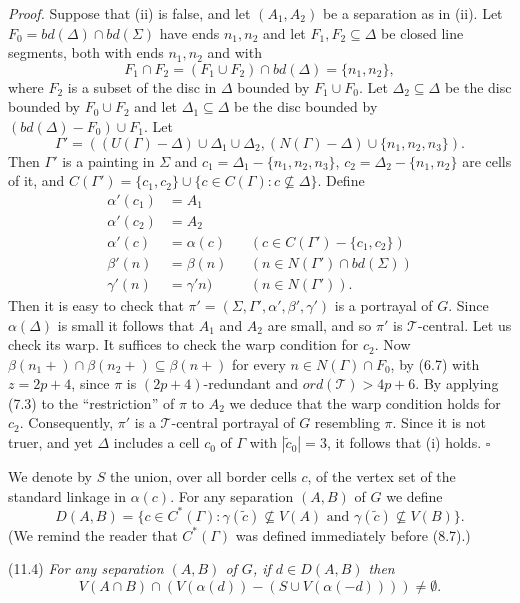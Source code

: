 \textit{Proof.} Suppose that (ii) is false, and let $(A_1, A_2)$ be a separation as in (ii). Let $F_0 = bd(\Delta) \cap bd(\Sigma)$ have ends $n_1, n_2$ and let $F_1, F_2 \subseteq \Delta$ be closed line segments, both with ends $n_1, n_2$ and with
\begin{equation*}
F_1 \cap F_2 = (F_1 \cup F_2) \cap bd(\Delta) = \{n_1, n_2\},
\end{equation*}
where $F_2$ is a subset of the disc in $\Delta$ bounded by $F_1 \cup F_0$. Let $\Delta_2 \subseteq \Delta$ be the disc bounded by $F_0 \cup F_2$ and let $\Delta_1 \subseteq \Delta$ be the disc bounded by $(bd(\Delta) - F_0) \cup F_1$. Let
\begin{equation*}
\Gamma' = ((U(\Gamma) - \Delta) \cup \Delta_1 \cup \Delta_2, (N(\Gamma) - \Delta) \cup \{n_1, n_2, n_3\}).
\end{equation*}
Then $\Gamma'$ is a painting in $\Sigma$ and $c_1 = \Delta_1 - \{n_1, n_2, n_3\}$, $c_2 = \Delta_2 - \{n_1, n_2\}$ are cells of it, and $C(\Gamma') = \{c_1, c_2\} \cup \{c \in C(\Gamma) : c \nsubseteq \Delta\}$. Define
\begin{align*}
\alpha'(c_1) &= A_1 \\
\alpha'(c_2) &= A_2 \\
\alpha'(c) &= \alpha(c) && (c \in C(\Gamma') - \{c_1, c_2\}) \\
\beta'(n) &= \beta(n) && (n \in N(\Gamma') \cap bd(\Sigma)) \\
\gamma'(n) &= \gamma'n) && (n \in N(\Gamma')).
\end{align*}
Then it is easy to check that $\pi' = (\Sigma, \Gamma', \alpha', \beta', \gamma')$ is a portrayal of $G$. Since $\alpha(\Delta)$ is small it follows that $A_1$ and $A_2$ are small, and so $\pi'$ is $\mathscr{T}$-central. Let us check its warp. It suffices to check the warp condition for $c_2$. Now $\beta(n_1 +) \cap \beta(n_2 +) \subseteq \beta(n +)$ for every $n \in N(\Gamma) \cap F_0$, by (6.7) with $z = 2p + 4$, since $\pi$ is $(2p + 4)$-redundant and $ord(\mathscr{T}) > 4p + 6$. By applying (7.3) to the ``restriction'' of $\pi$ to $A_2$ we deduce that the warp condition holds for $c_2$. Consequently, $\pi'$ is a $\mathscr{T}$-central portrayal of $G$ resembling $\pi$. Since it is not truer, and yet $\Delta$ includes a cell $c_0$ of $\Gamma$ with $|\tilde{c}_0| = 3$, it follows that (i) holds. $\square$

We denote by $S$ the union, over all border cells $c$, of the vertex set of the standard linkage in $\alpha(c)$. For any separation $(A, B)$ of $G$ we define
\begin{equation*}
D(A, B) = \{c \in C^*(\Gamma) : \gamma(\tilde{c}) \nsubseteq V(A) \text{ and } \gamma(\tilde{c}) \nsubseteq V(B)\}.
\end{equation*}
(We remind the reader that $C^*(\Gamma)$ was defined immediately before (8.7).)

\stmt
(11.4) \textit{For any separation $(A, B)$ of $G$, if $d \in D(A, B)$ then}
\begin{equation*}
V(A \cap B) \cap (V(\alpha(d)) - (S \cup V(\alpha(-d)))) \ne \emptyset.
\end{equation*}

